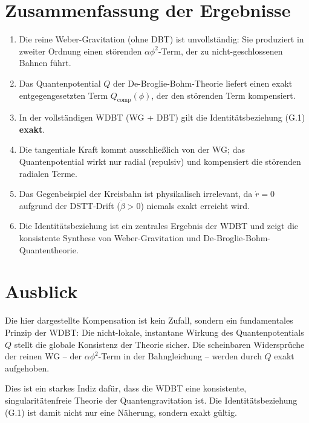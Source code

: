 \section{Zusammenfassung der Ergebnisse}
\label{app:identitaet_zusammenfassung}

\begin{enumerate}
    \item Die reine Weber-Gravitation (ohne DBT) ist unvollständig: Sie produziert in zweiter Ordnung einen störenden \(\alpha\phi^2\)-Term, der zu nicht-geschlossenen Bahnen führt.

    \item Das Quantenpotential \(Q\) der De-Broglie-Bohm-Theorie liefert einen exakt entgegengesetzten Term \(Q_{\text{comp}}(\phi)\), der den störenden Term kompensiert.

    \item In der vollständigen WDBT (WG + DBT) gilt die Identitätsbeziehung (G.1) \textbf{exakt}.

    \item Die tangentiale Kraft kommt ausschließlich von der WG; das Quantenpotential wirkt nur radial (repulsiv) und kompensiert die störenden radialen Terme.

    \item Das Gegenbeispiel der Kreisbahn ist physikalisch irrelevant, da \(\dot{r} = 0\) aufgrund der DSTT-Drift (\(\dot{\beta} > 0\)) niemals exakt erreicht wird.

    \item Die Identitätsbeziehung ist ein zentrales Ergebnis der WDBT und zeigt die konsistente Synthese von Weber-Gravitation und De-Broglie-Bohm-Quantentheorie.
\end{enumerate}

\section{Ausblick}
\label{app:identitaet_ausblick}

Die hier dargestellte Kompensation ist kein Zufall, sondern ein fundamentales Prinzip der WDBT: Die nicht-lokale, instantane Wirkung des Quantenpotentials \(Q\) stellt die globale Konsistenz der Theorie sicher. Die scheinbaren Widersprüche der reinen WG – der \(\alpha\phi^2\)-Term in der Bahngleichung – werden durch \(Q\) exakt aufgehoben.

Dies ist ein starkes Indiz dafür, dass die WDBT eine konsistente, singularitätenfreie Theorie der Quantengravitation ist. Die Identitätsbeziehung (G.1) ist damit nicht nur eine Näherung, sondern exakt gültig.